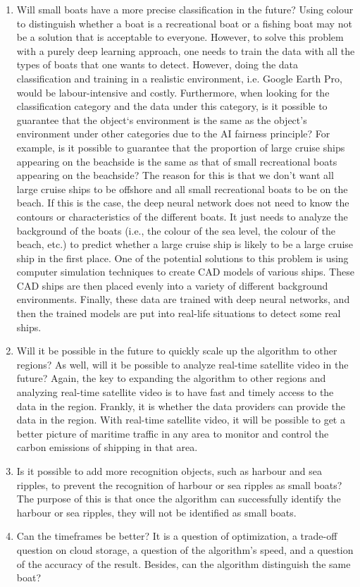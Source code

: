 \begin{enumerate}
    \item Will small boats have a more precise classification in the future? Using colour to distinguish whether a boat is a recreational boat or a fishing boat may not be a solution that is acceptable to everyone. However, to solve this problem with a purely deep learning approach, one needs to train the data with all the types of boats that one wants to detect. However, doing the data classification and training in a realistic environment, i.e. Google Earth Pro, would be labour-intensive and costly. Furthermore, when looking for the classification category and the data under this category, is it possible to guarantee that the object‘s environment is the same as the object's environment under other categories due to the AI fairness principle? For example, is it possible to guarantee that the proportion of large cruise ships appearing on the beachside is the same as that of small recreational boats appearing on the beachside? The reason for this is that we don't want all large cruise ships to be offshore and all small recreational boats to be on the beach. If this is the case, the deep neural network does not need to know the contours or characteristics of the different boats. It just needs to analyze the background of the boats (i.e., the colour of the sea level, the colour of the beach, etc.) to predict whether a large cruise ship is likely to be a large cruise ship in the first place. One of the potential solutions to this problem is using computer simulation techniques to create CAD models of various ships. These CAD ships are then placed evenly into a variety of different background environments. Finally, these data are trained with deep neural networks, and then the trained models are put into real-life situations to detect some real ships.
    
    \item Will it be possible in the future to quickly scale up the algorithm to other regions? As well, will it be possible to analyze real-time satellite video in the future? Again, the key to expanding the algorithm to other regions and analyzing real-time satellite video is to have fast and timely access to the data in the region. Frankly, it is whether the data providers can provide the data in the region. With real-time satellite video, it will be possible to get a better picture of maritime traffic in any area to monitor and control the carbon emissions of shipping in that area.
    
    \item Is it possible to add more recognition objects, such as harbour and sea ripples, to prevent the recognition of harbour or sea ripples as small boats? The purpose of this is that once the algorithm can successfully identify the harbour or sea ripples, they will not be identified as small boats.
    
    \item Can the timeframes be better? It is a question of optimization, a trade-off question on cloud storage, a question of the algorithm's speed, and a question of the accuracy of the result. Besides, can the algorithm distinguish the same boat?
\end{enumerate}
 
